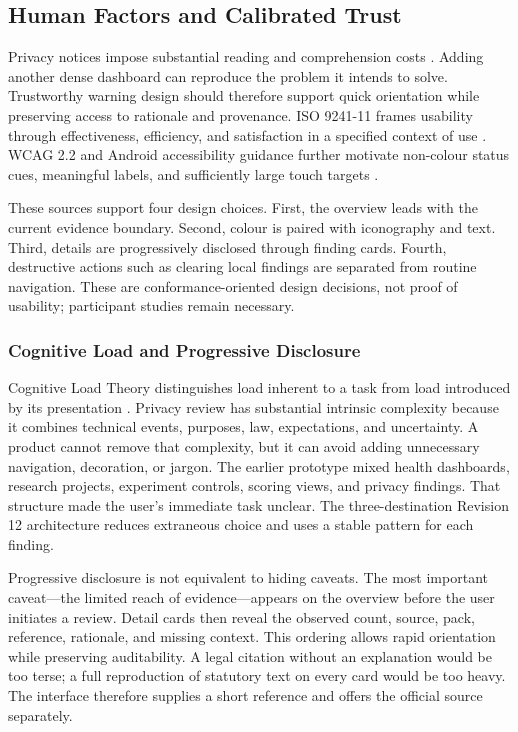 \subsection{Human Factors and Calibrated Trust}

Privacy notices impose substantial reading and comprehension costs \cite{12,13}. Adding another dense dashboard can reproduce the problem it intends to solve. Trustworthy warning design should therefore support quick orientation while preserving access to rationale and provenance. ISO 9241-11 frames usability through effectiveness, efficiency, and satisfaction in a specified context of use \cite{iso924111}. WCAG 2.2 and Android accessibility guidance further motivate non-colour status cues, meaningful labels, and sufficiently large touch targets \cite{wcag22,androidaccess}.

These sources support four design choices. First, the overview leads with the current evidence boundary. Second, colour is paired with iconography and text. Third, details are progressively disclosed through finding cards. Fourth, destructive actions such as clearing local findings are separated from routine navigation. These are conformance-oriented design decisions, not proof of usability; participant studies remain necessary.

\subsubsection{Cognitive Load and Progressive Disclosure}

Cognitive Load Theory distinguishes load inherent to a task from load introduced by its presentation \cite{27}. Privacy review has substantial intrinsic complexity because it combines technical events, purposes, law, expectations, and uncertainty. A product cannot remove that complexity, but it can avoid adding unnecessary navigation, decoration, or jargon. The earlier prototype mixed health dashboards, research projects, experiment controls, scoring views, and privacy findings. That structure made the user's immediate task unclear. The three-destination Revision 12 architecture reduces extraneous choice and uses a stable pattern for each finding.

Progressive disclosure is not equivalent to hiding caveats. The most important caveat---the limited reach of evidence---appears on the overview before the user initiates a review. Detail cards then reveal the observed count, source, pack, reference, rationale, and missing context. This ordering allows rapid orientation while preserving auditability. A legal citation without an explanation would be too terse; a full reproduction of statutory text on every card would be too heavy. The interface therefore supplies a short reference and offers the official source separately.

